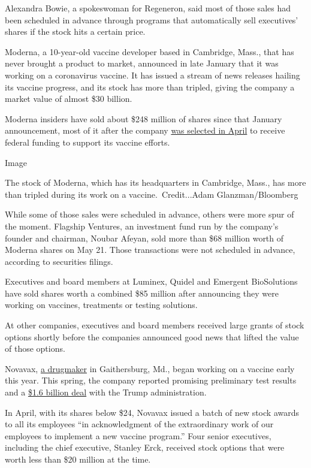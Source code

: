 Alexandra Bowie, a spokeswoman for Regeneron, said most of those sales
had been scheduled in advance through programs that automatically sell
executives' shares if the stock hits a certain price.

Moderna, a 10-year-old vaccine developer based in Cambridge, Mass., that
has never brought a product to market, announced in late January that it
was working on a coronavirus vaccine. It has issued a stream of news
releases hailing its vaccine progress, and its stock has more than
tripled, giving the company a market value of almost \$30 billion.

Moderna insiders have sold about \$248 million of shares since that
January announcement, most of it after the company
\href{https://investors.modernatx.com/news-releases/news-release-details/moderna-announces-award-us-government-agency-barda-483-million}{was
selected in April} to receive federal funding to support its vaccine
efforts.

Image

The stock of Moderna, which has its headquarters in Cambridge, Mass.,
has more than tripled during its work on a vaccine.~Credit...Adam
Glanzman/Bloomberg

While some of those sales were scheduled in advance, others were more
spur of the moment. Flagship Ventures, an investment fund run by the
company's founder and chairman, Noubar Afeyan, sold more than \$68
million worth of Moderna shares on May 21. Those transactions were not
scheduled in advance, according to securities filings.

Executives and board members at Luminex, Quidel and Emergent
BioSolutions have sold shares worth a combined \$85 million after
announcing they were working on vaccines, treatments or testing
solutions.

At other companies, executives and board members received large grants
of stock options shortly before the companies announced good news that
lifted the value of those options.

Novavax,
\href{https://www.nytimes.com/2020/07/16/health/coronavirus-vaccine-novavax.html}{a
drugmaker} in Gaithersburg, Md., began working on a vaccine early this
year. This spring, the company reported promising preliminary test
results and a
\href{https://www.nytimes.com/2020/07/07/health/novavax-coronavirus-vaccine-warp-speed.html}{\$1.6
billion deal} with the Trump administration.

In April, with its shares below \$24, Novavax issued a batch of new
stock awards to all its employees ``in acknowledgment of the
extraordinary work of our employees to implement a new vaccine
program.'' Four senior executives, including the chief executive,
Stanley Erck, received stock options that were worth less than \$20
million at the time.

